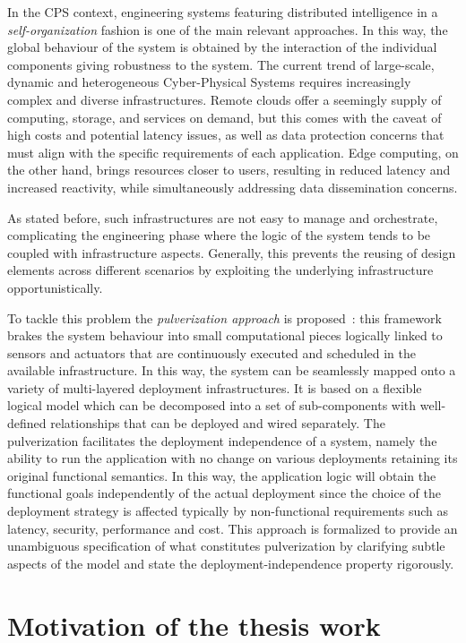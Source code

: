 In the CPS context, engineering systems featuring distributed intelligence in a \emph{self-organization} fashion is one of the main relevant
approaches. In this way, the global behaviour of the system is obtained by the interaction of the individual components giving robustness to the
system. The current trend of large-scale, dynamic and heterogeneous Cyber-Physical Systems requires increasingly complex and diverse
infrastructures. Remote clouds offer a seemingly supply of computing, storage, and services on demand, but this comes with the caveat of high
costs and potential latency issues, as well as data protection concerns that must align with the specific requirements of each application. Edge
computing, on the other hand, brings resources closer to users, resulting in reduced latency and increased reactivity, while simultaneously
addressing data dissemination concerns.

As stated before, such infrastructures are not easy to manage and orchestrate, complicating the engineering phase where the logic of the
system tends to be coupled with infrastructure aspects. Generally, this prevents the reusing of design elements across different scenarios by
exploiting the underlying infrastructure opportunistically.

To tackle this problem the \emph{pulverization approach} is proposed~\cite{DBLP:journals/fi/CasadeiPPVW20}: this framework brakes the system behaviour into small
computational pieces logically linked to sensors and actuators that are continuously executed and scheduled in the available infrastructure.
In this way, the system can be seamlessly mapped onto a variety of multi-layered deployment infrastructures.
It is based on a flexible logical model which can be decomposed into a set of sub-components with well-defined relationships that can be deployed and
wired separately. The pulverization facilitates the deployment independence of a system, namely the ability to run the application with no change
on various deployments retaining its original functional semantics.
In this way, the application logic will obtain the functional goals independently of the actual deployment since the choice of the deployment
strategy is affected typically by non-functional requirements such as latency, security, performance and cost.
This approach is formalized to provide an unambiguous specification of what constitutes pulverization by clarifying subtle aspects of the model
and state the deployment-independence property rigorously.

\section{Motivation of the thesis work}

